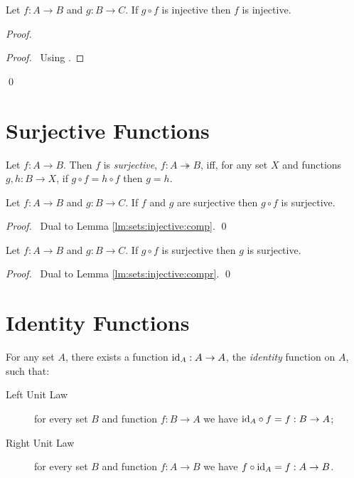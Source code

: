 \begin{lm}
  \label{lm:sets:injective:compr}
 Let $f : A \rightarrow B$ and $g : B \rightarrow C$. If $g \circ f$ is
injective then $f$ is injective.
\end{lm}

\begin{proof}
 \pf
 \begin{proof}
   \pf\ Using .
 \end{proof}
 \qed
\end{proof}

\section{Surjective Functions}

\begin{df}[Surjective]
  Let $f : A \rightarrow B$. Then $f$ is \emph{surjective}, $f : A
\twoheadrightarrow B$, iff, for any set
  $X$ and functions $g, h : B \rightarrow X$, if $g \circ f = h \circ f$ then
  $g
  = h$.
\end{df}

\begin{lm}
 Let $f : A \rightarrow B$ and $g : B \rightarrow C$. If $f$ and $g$ are
surjective then $g \circ f$ is surjective.
\end{lm}

\begin{proof}
 \pf\ Dual to Lemma \ref{lm:sets:injective:comp}. \qed
\end{proof}

\begin{lm}
 Let $f : A \rightarrow B$ and $g : B \rightarrow C$. If $g \circ f$ is
surjective then $g$ is surjective.
\end{lm}

\begin{proof}
 \pf\ Dual to Lemma \ref{lm:sets:injective:compr}. \qed
\end{proof}

\section{Identity Functions}

\begin{ax}
  For any set $A$, there exists a function $\mathrm{id}_{A} : A \rightarrow A$, the
  \emph{identity} function on $A$, such that:
  \begin{description}
    \item[Left Unit Law] for every set $B$ and function $f : B \rightarrow A$
    we have $\mathrm{id}_{A}      \circ f = f : B \rightarrow A$;
    \item[Right Unit Law] for every set $B$ and function $f : A \rightarrow
    B$
    we have $f      \circ \mathrm{id}_{A} = f : A \rightarrow B$.
  \end{description}
\end{ax}

